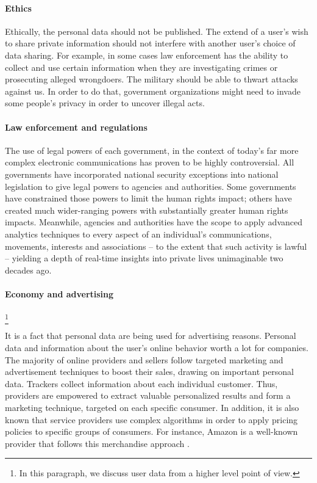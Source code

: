 \paragraph{Ethics}
Ethically, the personal data should not be published. The extend of a user's 
wish to share private information should not interfere with another user's 
choice of data sharing.  For example, in some cases law enforcement has the 
ability to collect and use certain information when they are investigating 
crimes or prosecuting alleged wrongdoers. The military  should  be able to 
thwart attacks against us. In order to do that, government organizations might 
need to invade some people's privacy in order to uncover illegal acts. 

\paragraph{Law enforcement and regulations}
The use of legal powers of each government, in the context of today's far more 
complex electronic communications has proven to be highly controversial. 
All governments have incorporated national security exceptions into national 
legislation to give legal powers to agencies and authorities. Some governments 
have constrained those powers to limit the human rights impact; others have 
created much wider-ranging powers with substantially greater human rights 
impacts. Meanwhile, agencies and authorities have the scope to apply advanced 
analytics techniques to every aspect of an individual's communications, 
movements, interests and associations – to the extent that such activity is 
lawful – yielding a depth of real-time insights into private lives unimaginable 
two decades ago.

\paragraph{Economy and advertising}
\footnote{In this paragraph, we discuss user data from a higher level point of 
view.}

It is a fact that personal data are being used for advertising reasons. 
Personal data and information about the user's online behavior worth a lot for 
companies. The majority of online providers and sellers follow targeted 
marketing and advertisement techniques to boost their sales, drawing on 
important personal data. Trackers collect information about each individual 
customer. Thus, providers are empowered to extract valuable personalized results 
and form a marketing technique, targeted on each specific consumer.
In addition, it is also known that service providers use complex algorithms
in order to apply pricing policies to specific groups of consumers.
For instance, Amazon is a well-known provider that follows this merchandise 
approach \cite{chen2016empirical}. 

